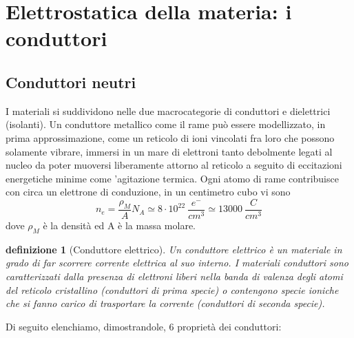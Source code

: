 \documentclass[10pt,a4paper]{article}
\newtheorem{definizione}{definizione}
\begin{document}
\section{Elettrostatica della materia: i conduttori}
\subsection{Conduttori neutri}
I materiali si suddividono nelle due macrocategorie di conduttori e dielettrici (isolanti). Un conduttore metallico come il rame può essere modellizzato, in prima approssimazione, come un reticolo di ioni vincolati fra loro che possono solamente vibrare, immersi in un mare di elettroni tanto debolmente legati al nucleo da poter muoversi liberamente attorno al reticolo a seguito di eccitazioni energetiche minime come 'agitazione termica. Ogni atomo di rame contribuisce con circa un elettrone di conduzione, in un centimetro cubo vi sono
\[n_e = \frac{\rho_M }{A}N_A \simeq 8\cdot 10^22\ \frac{e^-}{cm^3}\simeq13000\ \frac{C}{cm^3}\]
dove $\rho_M$ è la densità ed A è la massa molare.
\begin{definizione}[Conduttore elettrico]
	Un conduttore elettrico è un materiale in grado di far scorrere corrente elettrica al suo interno. I materiali conduttori sono caratterizzati dalla presenza di elettroni liberi nella banda di valenza degli atomi del reticolo cristallino (conduttori di prima specie) o contengono specie ioniche che si fanno carico di trasportare la corrente (conduttori di seconda specie).
\end{definizione}
Di seguito elenchiamo, dimostrandole, 6 proprietà dei conduttori:
\end{document}

